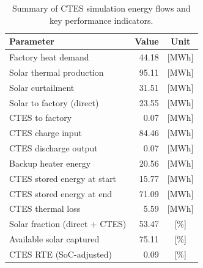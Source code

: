 \renewcommand{\arraystretch}{1.2}
\begin{table}[h]
\centering
\begin{tabular}{l|r c}
\hline
Parameter & Value & Unit \\
\hline
Factory heat demand & 44.18 & [MWh] \\
Solar thermal production & 95.11 & [MWh] \\
Solar curtailment & 31.51 & [MWh] \\
Solar to factory (direct) & 23.55 & [MWh] \\
CTES to factory & 0.07 & [MWh] \\
CTES charge input & 84.46 & [MWh] \\
CTES discharge output & 0.07 & [MWh] \\
Backup heater energy & 20.56 & [MWh] \\
CTES stored energy at start & 15.77 & [MWh] \\
CTES stored energy at end & 71.09 & [MWh] \\
CTES thermal loss & 5.59 & [MWh] \\
\hline
Solar fraction (direct + CTES) & 53.47 & [\%] \\
Available solar captured & 75.11 & [\%] \\
CTES RTE (SoC-adjusted) & 0.09 & [\%] \\
\hline
\end{tabular}
\caption{Summary of CTES simulation energy flows and key performance indicators.}
\label{tab:ctes-simulation-summary}
\end{table}
